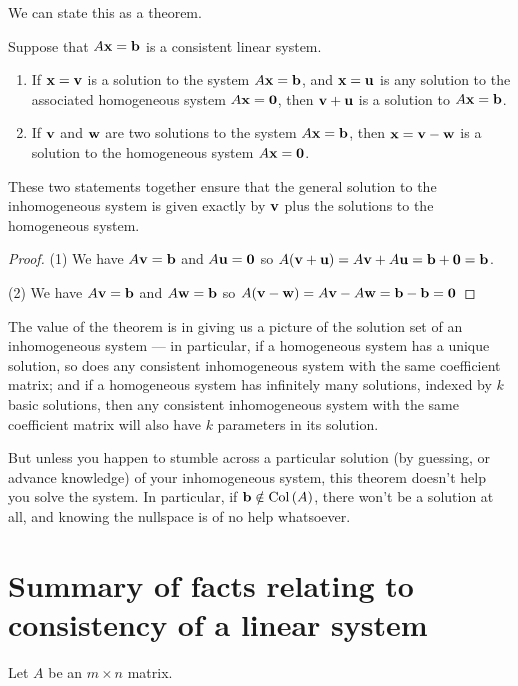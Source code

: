 We can state this as a theorem.

\begin{theorem}  

Suppose that $A\mathbf{x}=\mathbf{b}$ is a consistent 
linear system.
\begin{enumerate}
\item If $\mathbf{x}=\mathbf{v}$ is a solution to the system $A\mathbf{x} = \mathbf{b}$, and $\mathbf{x} = \mathbf{u}$ is any solution to the associated homogeneous system $A\mathbf{x} = \mathbf{0}$,
then $\mathbf{v} + \mathbf{u}$ is a solution to $A\mathbf{x} = \mathbf{b}$.
\item If $\mathbf{v}$ and $\mathbf{w}$ are two solutions to the system $A\mathbf{x} = \mathbf{b}$, then $\mathbf{x} = \mathbf{v}-\mathbf{w}$ is a solution to the homogeneous system $A\mathbf{x} = \mathbf{0}$.
\end{enumerate}
These two statements together ensure that the general solution to the 
inhomogeneous system is given exactly by $\mathbf{v}$ plus the solutions to the
homogeneous system.
\end{theorem}

\begin{proof}

(1) We have $A\mathbf{v} = \mathbf{b}$ and $A\mathbf{u} = \mathbf{0}$ so $A(\mathbf{v}+\mathbf{u}) = A\mathbf{v} + A\mathbf{u} = \mathbf{b} + \mathbf{0} = \mathbf{b}$.

(2) We have $A\mathbf{v} = \mathbf{b}$ and $A\mathbf{w} = \mathbf{b}$ so $A(\mathbf{v} - \mathbf{w}) = A\mathbf{v} - A\mathbf{w} = \mathbf{b} - \mathbf{b} = \mathbf{0}$

\end{proof}

The value of the theorem is in giving us a picture of the solution set of
an inhomogeneous system --- in particular, if a homogeneous system has a unique solution, so does any consistent inhomogeneous system with the same coefficient matrix; and if a homogeneous system has infinitely many solutions, indexed by $k$ basic solutions, then any consistent inhomogeneous system with the same coefficient matrix will also have $k$ parameters in its solution.

 But unless you happen to stumble across a particular 
solution (by guessing, or advance knowledge) of your inhomogeneous system,
this theorem doesn't help you solve the system.  In particular, if $\mathbf{b} \notin \operatorname{Col\,}(A)$,
there won't be a solution at all, and knowing the nullspace is of no help
whatsoever.

\section{Summary of facts relating to consistency of a linear system}\label{consistency}
Let $A$ be an $m\times n$ matrix.

